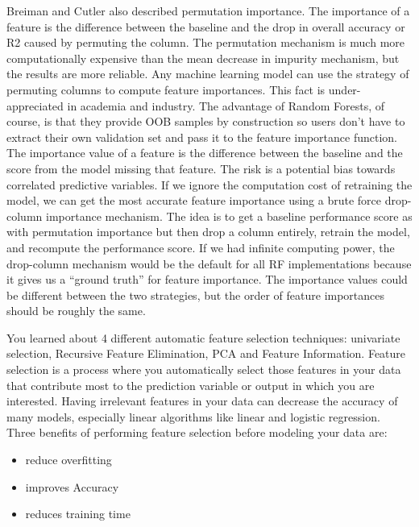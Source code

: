 \documentclass[preprint,12pt]{elsarticle}
\begin{document}
Breiman and Cutler also described permutation importance. The importance of a feature is the difference between the baseline and the drop in overall accuracy or R2 caused by permuting the column.  The permutation mechanism is much more computationally expensive than the mean decrease in impurity mechanism, but the results are more reliable.
Any machine learning model can use the strategy of permuting columns to compute feature importances. 
This fact is under-appreciated in academia and industry. 
The advantage of Random Forests, of course, is that they provide OOB samples by construction so users don't have to extract their own validation set and pass it to the feature importance function. 
The importance value of a feature is the difference between the baseline and the score from the model missing that feature. 
The risk is a potential bias towards correlated predictive variables. 
If we ignore the computation cost of retraining the model, we can get the most accurate feature importance using a brute force drop-column importance mechanism. The idea is to get a baseline performance score as with permutation importance but then drop a column entirely, retrain the model, and recompute the performance score. If we had infinite computing power, the drop-column mechanism would be the default for all RF implementations because it gives us a “ground truth” for feature importance. The importance values could be different between the two strategies, but the order of feature importances should be roughly the same. 



You learned about 4 different automatic feature selection techniques:  univariate selection, Recursive Feature Elimination, PCA and Feature Information.
Feature selection is a process where you automatically select those features in your data that contribute most to the prediction variable or output in which you are interested.
Having irrelevant features in your data can decrease the accuracy of many models, especially linear algorithms like linear and logistic regression.
Three benefits of performing feature selection before modeling your data are:
\begin{itemize}
\item reduce overfitting
\item improves Accuracy
\item reduces training time

\end{itemize}
\end{document}

